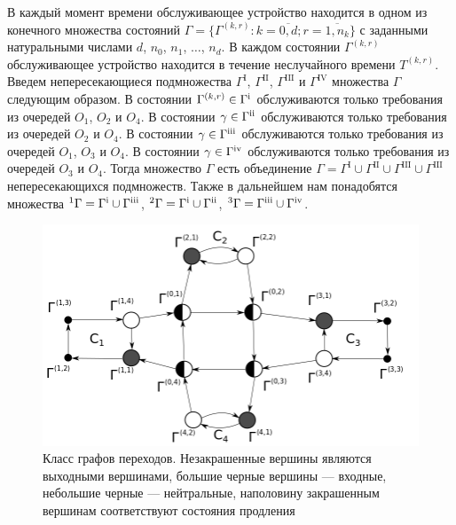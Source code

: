\documentclass[11pt]{ubs}
\newcommand{\Rmnum}[1]{\romannumeral #1}
\begin{document}
В каждый момент времени обслуживающее устройство находится в одном из конечного множества состояний $\Gamma=\{\Gamma^{(k,r)} \colon k=\overline{0,d}; r=\overline{1,n_k}\}$ с заданными натуральными числами $d$, $n_0$, $n_1$, $\ldots$, $n_d$. В каждом состоянии $\Gamma^{(k,r)}$ обслуживающее устройство находится в течение неслучайного времени $T^{(k,r)}$. 
Введем непересекающиеся подмножества $\Gamma^{\mathrm{I}}$, $\Gamma^{\mathrm{II}}$, $\Gamma^{\mathrm{III}}$ и $\Gamma^{\mathrm{IV}}$ множества $\Gamma$ следующим образом. 
В состоянии $\Gamma^{(k,r)} \in \Gamma^{\mathrm{\Rmnum{1}}}$ 
обслуживаются только требования из очередей $O_1$, $O_2$ и $O_4$.
В состоянии $\gamma \in \Gamma^{\mathrm{\Rmnum{2}}}$ обслуживаются только требования из очередей $O_2$ и $O_4$.
В состоянии $\gamma \in \Gamma^{\mathrm{\Rmnum{3}}}$ обслуживаются только требования из очередей $O_1$, $O_3$ и $O_4$.
В состоянии $\gamma \in \Gamma^{\mathrm{\Rmnum{4}}}$ обслуживаются только требования из очередей $O_3$ и $O_4$.
Тогда множество $\Gamma$ есть объединение $\Gamma = \Gamma^{\mathrm{I}} \cup \Gamma^{\mathrm{II}} \cup \Gamma^{\mathrm{III}} \cup \Gamma^{\mathrm{III}}$ непересекающихся подмножеств. Также в дальнейшем нам понадобятся множества ${}^1\Gamma=\Gamma^{\mathrm{\Rmnum{1}}} \cup \Gamma^{\mathrm{\Rmnum{3}}}$, 
${}^2\Gamma=\Gamma^{\mathrm{\Rmnum{1}}} \cup \Gamma^{\mathrm{\Rmnum{2}}}$,
${}^3\Gamma=\Gamma^{\mathrm{\Rmnum{3}}} \cup \Gamma^{\mathrm{\Rmnum{4}}}$. 

\begin{figure}[t]\centering
\includegraphics[scale=0.35]{GraphScheme3_grayscale.png} 
\caption{Класс графов переходов. Незакрашенные вершины являются выходными вершинами, большие черные вершины --- входные, небольшие черные --- нейтральные, наполовину закрашенным вершинам соответствуют состояния продления}
\label{GraphScheme}
\end{figure}
\end{document}
